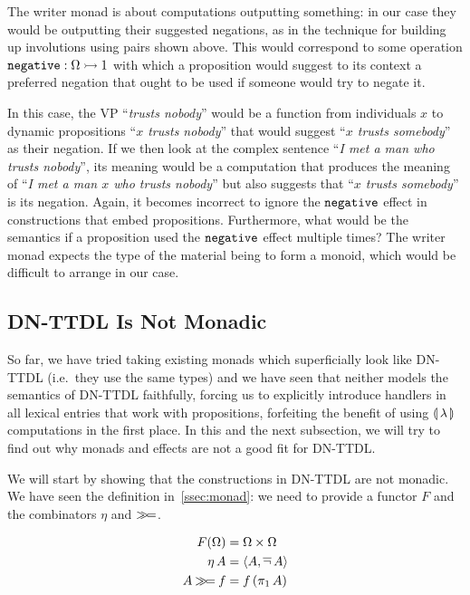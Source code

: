 The writer monad is about computations outputting something: in our case
they would be outputting their suggested negations, as in the technique for
building up involutions using pairs shown above. This would correspond to
some operation $\mathtt{negative} : \Omega \rightarrowtail 1$ with which a proposition
would suggest to its context a preferred negation that ought to be used if
someone would try to negate it.

In this case, the VP ``\emph{trusts nobody}'' would be a function from
individuals $x$ to dynamic propositions ``\emph{$x$ trusts nobody}'' that
would suggest ``\emph{$x$ trusts somebody}'' as their negation. If we then
look at the complex sentence ``\emph{I met a man who trusts nobody}'', its
meaning would be a computation that produces the meaning of ``\emph{I met a
  man $x$ who trusts nobody}'' but also suggests that ``\emph{$x$ trusts
  somebody}'' is its negation. Again, it becomes incorrect to ignore the
$\mathtt{negative}$ effect in constructions that embed
propositions. Furthermore, what would be the semantics if a proposition
used the $\mathtt{negative}$ effect multiple times? The writer monad expects
the type of the material being to form a monoid, which would be difficult
to arrange in our case.


\subsection{DN-TTDL Is Not Monadic}

So far, we have tried taking existing monads which superficially look like
DN-TTDL (i.e.\ they use the same types) and we have seen that neither
models the semantics of DN-TTDL faithfully, forcing us to explicitly
introduce handlers in all lexical entries that work with propositions,
forfeiting the benefit of using $\llparenthesis \, \lambda \, \rrparenthesis$ computations in the
first place. In this and the next subsection, we will try to find out why
monads and effects are not a good fit for DN-TTDL.

We will start by showing that the constructions in DN-TTDL are not
monadic. We have seen the definition in~\ref{ssec:monad}: we need to
provide a functor $F$ and the combinators $\eta$ and $\mathbin{\gg\!=}$.

\begin{align*}
  F(\Omega) &= \Omega \times \Omega \\
  \eta\,A &= \left< A, \mathop{\overline{\lnot}} A \right> \\
  A \mathbin{\gg\!=} f &= f\,(\pi_1\,A)
\end{align*}

